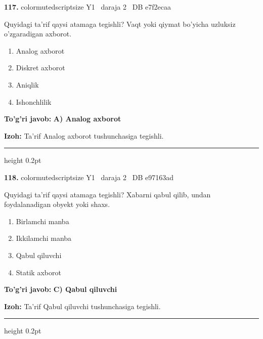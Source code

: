 \documentclass[10pt,a4paper,oneside]{article}
\begin{document}
\noindent\textbf{\color{ink}117.}  {color{muted}scriptsize Y1 \textbullet\ daraja 2 \textbullet\ DB e7f2ecaa}
\par
Quyidagi ta'rif qaysi atamaga tegishli? Vaqt yoki qiymat bo'yicha uzluksiz o'zgaradigan axborot.
\begin{enumerate}[label=\Alph*),leftmargin=9mm]
\item Analog axborot
\item Diskret axborot
\item Aniqlik
\item Ishonchlilik
\end{enumerate}
\begin{tcolorbox}[enhanced,breakable,colback=teal!4,colframe=teal!50!black,boxrule=0.5pt,arc=1.1mm,left=3mm,right=3mm,top=1.7mm,bottom=1.7mm,before skip=2mm,after skip=2mm]
\textbf{\color{teal}To'g'ri javob:} \textbf{A) Analog axborot}
\par\smallskip
\textbf{Izoh:} Ta'rif Analog axborot tushunchasiga tegishli.
\end{tcolorbox}
\vspace{2mm}\hrule height 0.2pt \vspace{3mm}

\noindent\textbf{\color{ink}118.}  {color{muted}scriptsize Y1 \textbullet\ daraja 2 \textbullet\ DB e97163ad}
\par
Quyidagi ta'rif qaysi atamaga tegishli? Xabarni qabul qilib, undan foydalanadigan obyekt yoki shaxs.
\begin{enumerate}[label=\Alph*),leftmargin=9mm]
\item Birlamchi manba
\item Ikkilamchi manba
\item Qabul qiluvchi
\item Statik axborot
\end{enumerate}
\begin{tcolorbox}[enhanced,breakable,colback=teal!4,colframe=teal!50!black,boxrule=0.5pt,arc=1.1mm,left=3mm,right=3mm,top=1.7mm,bottom=1.7mm,before skip=2mm,after skip=2mm]
\textbf{\color{teal}To'g'ri javob:} \textbf{C) Qabul qiluvchi}
\par\smallskip
\textbf{Izoh:} Ta'rif Qabul qiluvchi tushunchasiga tegishli.
\end{tcolorbox}
\vspace{2mm}\hrule height 0.2pt \vspace{3mm}
\end{document}
